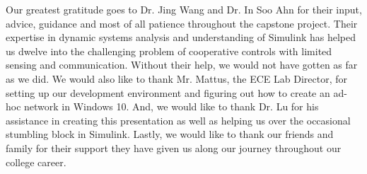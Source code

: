 \documentclass[conference]{IEEEtran}
\begin{document}
Our greatest gratitude goes to Dr. Jing Wang and Dr. In Soo Ahn for their input,
advice, guidance and most of all patience throughout the capstone project. Their
expertise in dynamic systems analysis and understanding of Simulink has helped us
dwelve into the challenging problem of cooperative controls with limited sensing and
communication. Without their help, we would not have gotten as far as we did.
We would also like to thank Mr. Mattus, the ECE Lab Director, for setting up
our development environment and figuring out how to create an ad-hoc network in
Windows 10.
And, we would like to thank Dr. Lu for his assistance in creating this presentation
as well as helping us over the occasional stumbling block in Simulink.
Lastly, we would like to thank our friends and family for their support they have
given us along our journey throughout our college career.






\end{document}
